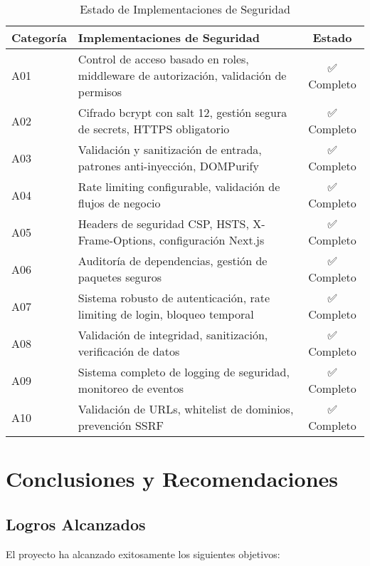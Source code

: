 \documentclass[12pt,a4paper]{article}
\begin{document}
\begin{table}[H]
\centering
\begin{tabularx}{\textwidth}{|l|X|c|}
\hline
\textbf{Categoría} & \textbf{Implementaciones de Seguridad} & \textbf{Estado} \\
\hline
A01 & Control de acceso basado en roles, middleware de autorización, validación de permisos & ✅ Completo \\
\hline
A02 & Cifrado bcrypt con salt 12, gestión segura de secrets, HTTPS obligatorio & ✅ Completo \\
\hline
A03 & Validación y sanitización de entrada, patrones anti-inyección, DOMPurify & ✅ Completo \\
\hline
A04 & Rate limiting configurable, validación de flujos de negocio & ✅ Completo \\
\hline
A05 & Headers de seguridad CSP, HSTS, X-Frame-Options, configuración Next.js & ✅ Completo \\
\hline
A06 & Auditoría de dependencias, gestión de paquetes seguros & ✅ Completo \\
\hline
A07 & Sistema robusto de autenticación, rate limiting de login, bloqueo temporal & ✅ Completo \\
\hline
A08 & Validación de integridad, sanitización, verificación de datos & ✅ Completo \\
\hline
A09 & Sistema completo de logging de seguridad, monitoreo de eventos & ✅ Completo \\
\hline
A10 & Validación de URLs, whitelist de dominios, prevención SSRF & ✅ Completo \\
\hline
\end{tabularx}
\caption{Estado de Implementaciones de Seguridad}
\end{table}

\section{Conclusiones y Recomendaciones}

\subsection{Logros Alcanzados}

El proyecto ha alcanzado exitosamente los siguientes objetivos:
\end{document}
